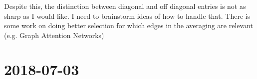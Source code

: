 \documentclass[a4paper]{article}
\newcommand{\DatestampYMD}[3]{\mbox{#1-#2-#3}}
\newcommand{\entry}[3]{\newpage\section*{\DatestampYMD{#1}{#2}{#3}} }
\begin{document}
\begin{figure}[H]
\begin{minipage}{.45\linewidth}
    \end{minipage}
    \centering
    \label{fig:pairwise3inf_plot}
\end{figure}
Despite this, the distinction between diagonal and off diagonal entries is not as sharp as I would like.
I need to brainstorm ideas of how to handle that.
There is some work on doing better selection for which edges in the averaging are relevant (e.g. Graph Attention Networks)

\entry{2018}{07}{03}
\end{document}
